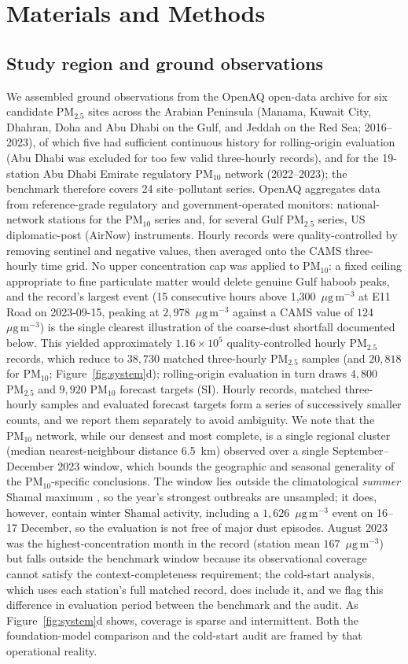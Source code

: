\documentclass[review,times,authoryear]{elsarticle}
\newcommand*{\ugm}{\ensuremath{\mu\mathrm{g\,m^{-3}}}}
\newcommand*{\pmtf}{\ensuremath{\mathrm{PM_{2.5}}}}
\newcommand*{\pmten}{\ensuremath{\mathrm{PM_{10}}}}
\begin{document}
\section{Materials and Methods}

\subsection{Study region and ground observations}
We assembled ground observations from the OpenAQ open-data archive for six candidate \pmtf{} sites across the Arabian Peninsula (Manama, Kuwait City, Dhahran, Doha and Abu Dhabi on the Gulf, and Jeddah on the Red Sea; 2016--2023), of which five had sufficient continuous history for rolling-origin evaluation (Abu Dhabi was excluded for too few valid three-hourly records), and for the 19-station Abu Dhabi Emirate regulatory \pmten{} network (2022--2023); the benchmark therefore covers 24 site--pollutant series. OpenAQ aggregates data from reference-grade regulatory and government-operated monitors: national-network stations for the \pmten{} series and, for several Gulf \pmtf{} series, US diplomatic-post (AirNow) instruments. Hourly records were quality-controlled by removing sentinel and negative values, then averaged onto the CAMS three-hourly time grid. No upper concentration cap was applied to \pmten{}: a fixed ceiling appropriate to fine particulate matter would delete genuine Gulf haboob peaks, and the record's largest event (15 consecutive hours above 1{,}300~\ugm{} at E11 Road on 2023-09-15, peaking at $2{,}978$~\ugm{} against a CAMS value of $124$~\ugm) is the single clearest illustration of the coarse-dust shortfall documented below. This yielded approximately $1.16\times10^{5}$ quality-controlled hourly \pmtf{} records, which reduce to $38{,}730$ matched three-hourly \pmtf{} samples (and $20{,}818$ for \pmten{}; Figure~\ref{fig:system}d); rolling-origin evaluation in turn draws $4{,}800$ \pmtf{} and $9{,}920$ \pmten{} forecast targets (SI). Hourly records, matched three-hourly samples and evaluated forecast targets form a series of successively smaller counts, and we report them separately to avoid ambiguity. We note that the \pmten{} network, while our densest and most complete, is a single regional cluster (median nearest-neighbour distance 6.5~km) observed over a single September--December 2023 window, which bounds the geographic and seasonal generality of the \pmten{}-specific conclusions. The window lies outside the climatological \emph{summer} Shamal maximum \citep{yu2016,gandham2020}, so the year's strongest outbreaks are unsampled; it does, however, contain winter Shamal activity, including a $1{,}626$~\ugm{} event on 16--17 December, so the evaluation is not free of major dust episodes. August 2023 was the highest-concentration month in the record (station mean $167$~\ugm) but falls outside the benchmark window because its observational coverage cannot satisfy the context-completeness requirement; the cold-start analysis, which uses each station's full matched record, does include it, and we flag this difference in evaluation period between the benchmark and the audit. As Figure~\ref{fig:system}d shows, coverage is sparse and intermittent. Both the foundation-model comparison and the cold-start audit are framed by that operational reality.
\end{document}

